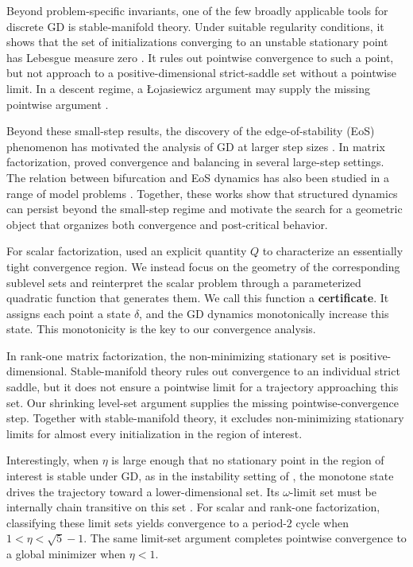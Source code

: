 \documentclass{article}
\begin{document}
Beyond problem-specific invariants, one of the few broadly applicable tools for
discrete GD is stable-manifold theory. Under suitable regularity conditions, it
shows that the set of initializations converging to an unstable stationary
point has Lebesgue measure zero
\citep{lee2016gradient,panageas2017gradient}. It rules out pointwise convergence
to such a point, but not approach to a positive-dimensional strict-saddle set
without a pointwise limit. In a descent regime, a {\L}ojasiewicz argument may
supply the missing pointwise argument \citep{absil2005convergence}.

Beyond these small-step results, the discovery of the edge-of-stability (EoS)
phenomenon has motivated the analysis of GD at larger step sizes
\citep{cohen2021gradient}. In matrix factorization, \citet{wang2022large} proved
convergence and balancing in several large-step settings. The relation between
bifurcation and EoS dynamics has also been studied in a range of model
problems \citep{song2023trajectory,zhu2022understanding,chen2023beyond}.
Together, these
works show that structured dynamics can persist beyond the small-step regime
and motivate the search for a geometric object that organizes both convergence
and post-critical behavior.

For scalar factorization, \citet{liang2025gradient} used an explicit quantity
$Q$ to characterize an essentially tight convergence region. We instead focus
on the geometry of the corresponding sublevel sets and reinterpret the scalar
problem through a parameterized quadratic function that generates them. We call
this function a \textbf{certificate}. It assigns each point a state $\delta$,
and the GD dynamics monotonically increase this state. This monotonicity is the
key to our convergence analysis.

In rank-one matrix factorization, the non-minimizing stationary set is
positive-dimensional. Stable-manifold theory rules out convergence to an
individual strict saddle, but it does not ensure a pointwise limit for a
trajectory approaching this set. Our shrinking level-set argument supplies the
missing pointwise-convergence step. Together with stable-manifold theory, it
excludes non-minimizing stationary limits for almost every initialization in
the region of interest.

Interestingly, when $\eta$ is large enough that no stationary point in the
region of interest is stable under GD, as in the instability setting of
\citet{ahn2022understanding}, the monotone state drives the trajectory toward a
lower-dimensional set. Its $\omega$-limit set must be internally chain
transitive on this set \citep{hirsch2001chain}. For scalar and rank-one
factorization, classifying these limit sets yields convergence to a period-$2$
cycle when $1<\eta<\sqrt5-1$. The same limit-set argument completes pointwise
convergence to a global minimizer when $\eta<1$.
\end{document}
